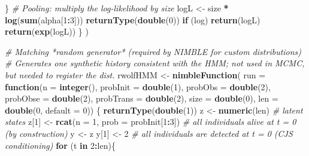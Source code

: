 \documentclass[
  12pt,
]{krantz}
\newenvironment{Shaded}{\begin{snugshade}}{\end{snugshade}}
\newcommand{\AttributeTok}[1]{\textcolor[rgb]{0.13,0.29,0.53}{#1}}
\newcommand{\CommentTok}[1]{\textcolor[rgb]{0.56,0.35,0.01}{\textit{#1}}}
\newcommand{\ControlFlowTok}[1]{\textcolor[rgb]{0.13,0.29,0.53}{\textbf{#1}}}
\newcommand{\DecValTok}[1]{\textcolor[rgb]{0.00,0.00,0.81}{#1}}
\newcommand{\FunctionTok}[1]{\textcolor[rgb]{0.13,0.29,0.53}{\textbf{#1}}}
\newcommand{\NormalTok}[1]{#1}
\newcommand{\OtherTok}[1]{\textcolor[rgb]{0.56,0.35,0.01}{#1}}
\newcommand{\SpecialCharTok}[1]{\textcolor[rgb]{0.81,0.36,0.00}{\textbf{#1}}}
\begin{document}
\begin{Shaded}
\begin{Highlighting}[]
\NormalTok{    \}}
    \CommentTok{\# Pooling: multiply the log{-}likelihood by \textquotesingle{}size\textquotesingle{}}
\NormalTok{    logL }\OtherTok{\textless{}{-}}\NormalTok{ size }\SpecialCharTok{*} \FunctionTok{log}\NormalTok{(}\FunctionTok{sum}\NormalTok{(alpha[}\DecValTok{1}\SpecialCharTok{:}\DecValTok{3}\NormalTok{]))}
    \FunctionTok{returnType}\NormalTok{(}\FunctionTok{double}\NormalTok{(}\DecValTok{0}\NormalTok{))}
    \ControlFlowTok{if}\NormalTok{ (log) }\FunctionTok{return}\NormalTok{(logL)}
    \FunctionTok{return}\NormalTok{(}\FunctionTok{exp}\NormalTok{(logL))}
\NormalTok{  \}}
\NormalTok{)}

\CommentTok{\# Matching *random generator* (required by NIMBLE for custom distributions)}
\CommentTok{\# Generates one synthetic history consistent with the HMM; not used in MCMC, but needed to register the dist.}
\NormalTok{rwolfHMM }\OtherTok{\textless{}{-}} \FunctionTok{nimbleFunction}\NormalTok{(}
  \AttributeTok{run =} \ControlFlowTok{function}\NormalTok{(}\AttributeTok{n =} \FunctionTok{integer}\NormalTok{(),}
                 \AttributeTok{probInit =} \FunctionTok{double}\NormalTok{(}\DecValTok{1}\NormalTok{),}
                 \AttributeTok{probObs =} \FunctionTok{double}\NormalTok{(}\DecValTok{2}\NormalTok{),}
                 \AttributeTok{probObse =} \FunctionTok{double}\NormalTok{(}\DecValTok{2}\NormalTok{),}
                 \AttributeTok{probTrans =} \FunctionTok{double}\NormalTok{(}\DecValTok{2}\NormalTok{),}
                 \AttributeTok{size =} \FunctionTok{double}\NormalTok{(}\DecValTok{0}\NormalTok{),}
                 \AttributeTok{len =} \FunctionTok{double}\NormalTok{(}\DecValTok{0}\NormalTok{, }\AttributeTok{default =} \DecValTok{0}\NormalTok{)) \{}
    \FunctionTok{returnType}\NormalTok{(}\FunctionTok{double}\NormalTok{(}\DecValTok{1}\NormalTok{))}
\NormalTok{    z }\OtherTok{\textless{}{-}} \FunctionTok{numeric}\NormalTok{(len) }\CommentTok{\# latent states}
\NormalTok{    z[}\DecValTok{1}\NormalTok{] }\OtherTok{\textless{}{-}} \FunctionTok{rcat}\NormalTok{(}\AttributeTok{n =} \DecValTok{1}\NormalTok{, }\AttributeTok{prob =}\NormalTok{ probInit[}\DecValTok{1}\SpecialCharTok{:}\DecValTok{3}\NormalTok{]) }\CommentTok{\# all individuals alive at t = 0 (by construction)}
\NormalTok{    y }\OtherTok{\textless{}{-}}\NormalTok{ z}
\NormalTok{    y[}\DecValTok{1}\NormalTok{] }\OtherTok{\textless{}{-}} \DecValTok{2} \CommentTok{\# all individuals are detected at t = 0 (CJS conditioning)}
    \ControlFlowTok{for}\NormalTok{ (t }\ControlFlowTok{in} \DecValTok{2}\SpecialCharTok{:}\NormalTok{len)\{}

\end{Highlighting}
\end{Shaded}
\end{document}
